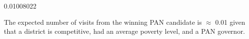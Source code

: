 \documentclass[12pt,letterpaper]{article}
\begin{document}
\begin{enumerate}
	  
	
	\begin{verbnobox}[\footnotesize]
		0.01008022
	\end{verbnobox}		
	
	The expected number of visits from the winning PAN candidate is $\approx$ 0.01 given that a district is competitive, had an average poverty level, and a PAN governor.\\
\end{enumerate}
\end{document}
